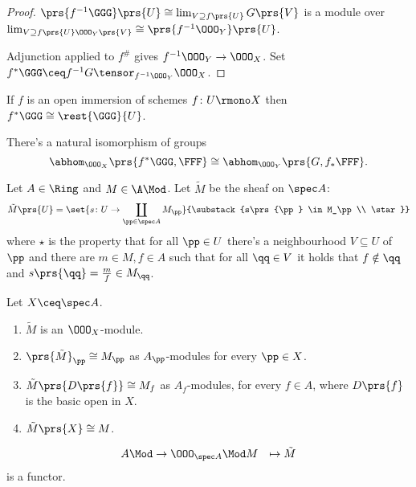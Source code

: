 \documentclass[10pt,a4paper,twoside,openany,hidelinks]{book}
\begin{document}
\begin{proof}
$\prs{f^{-1}\GGG}\prs{U} \cong \lim_{V \supseteq f\prs{U}} G\prs{V}$ is a module over $\lim_{V \supseteq f\prs{U} \OOO_Y\prs{V}} \cong \prs{f^{-1}\OOO_Y}\prs{U}$.

Adjunction applied to $f^\#$ gives $f^{-1}\OOO_Y \to \OOO_X$.
Set $f^* \GGG \ceq f^{-1}G \tensor_{f^{-1}\OOO_Y} \OOO_X$.
\end{proof}


\begin{remark}
If $f$ is an open immersion of schemes $f \colon U \rmono X$ then $f^* \GGG \cong \rest{\GGG}{U}$.
\end{remark}

\begin{fact}
There's a natural isomorphism of groups
\[\abhom_{\OOO_X}\prs{f^* \GGG, \FFF} \cong \abhom_{\OOO_Y}\prs{G, f_*\FFF} \text{.}\]
\end{fact}

\begin{definition}
Let $A \in \Ring$ and $M \in \A\Mod$. Let $\tilde{M}$ be the sheaf on $\spec A$:
\[\tilde{M}\prs{U} = \set{s \colon U \to \coprod_{\pp \in \spec A} M_\pp}{\substack{s\prs{\pp} \in M_\pp \\ \star}}\]
where $\star$ is the property that for all $\pp \in U$ there's a neighbourhood $V \subseteq U$ of $\pp$ and there are $m \in M, f \in A$ such that for all $\qq \in V$ it holds that $f \notin \qq$ and $s\prs{\qq} = \frac{m}{f} \in M_\qq$.
\end{definition}

\begin{proposition}
Let $X \ceq \spec A$.
\begin{enumerate}
\item $\tilde{M}$ is an $\OOO_X$-module.
\item $\prs{\tilde{M}}_\pp \cong M_\pp$ as $A_\pp$-modules for every $\pp \in X$.
\item $\tilde{M}\prs{D\prs{f}} \cong M_f$ as $A_f$-modules, for every $f \in A$, where $D\prs{f}$ is the basic open in $X$.
\item $\tilde{M}\prs{X} \cong M$.
\end{enumerate}
\end{proposition}

\begin{remark}
\begin{align*}
A\Mod &\to \OOO_{\spec A}\Mod
M &\mapsto \tilde{M}
\end{align*}
is a functor.
\end{remark}
\end{document}
